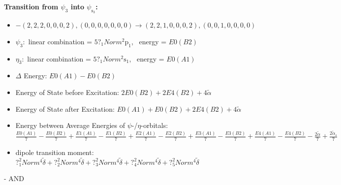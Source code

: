 \documentclass[12pt,a4paper]{article}
\begin{document}
        \noindent\textbf{Transition from $\psi_{3}$ into $\psi_{\text{s}_{3}}$:}
        \begin{itemize}
            \item $- (2, 2, 2, 0, 0, 0, 2), (0, 0, 0, 0, 0, 0, 0) \rightarrow (2, 2, 1, 0, 0, 0, 2), (0, 0, 1, 0, 0, 0, 0)$
        
            \item $\psi_{3}:$ linear combination = $5 ?_{1} Norm^{2} \text{p}_{1}$, \
            energy = $E0(B2)$
            
            \item $\eta_{3}:$ linear combination = $5 ?_{1} Norm^{2} \text{s}_{1}$, \
            energy = $E0(A1)$
            
                \item $\Delta$ Energy: $E0(A1) - E0(B2)$
                \item Energy of State before Excitation: $2 E0(B2) + 2 E4(B2) + 4 \tilde{\alpha}$
                \item Energy of State after Excitation: $E0(A1) + E0(B2) + 2 E4(B2) + 4 \tilde{\alpha}$
                \item Energy between Average Energies of $\psi$-/$\eta$-orbitals: $\frac{E0(A1)}{7} - \frac{E0(B2)}{7} + \frac{E1(A1)}{7} - \frac{E1(B2)}{7} + \frac{E2(A1)}{7} - \frac{E2(B2)}{7} + \frac{E3(A1)}{7} - \frac{E3(B2)}{7} + \frac{E4(A1)}{7} - \frac{E4(B2)}{7} - \frac{2 \tilde{\alpha}}{7} + \frac{2 \tilde{\alpha}_{s}}{7}$
            
            \item dipole transition moment: $?_{1}^{2} Norm^{4} \tilde{\delta} + ?_{2}^{2} Norm^{4} \tilde{\delta} + ?_{3}^{2} Norm^{4} \tilde{\delta} + ?_{4}^{2} Norm^{4} \tilde{\delta} + ?_{5}^{2} Norm^{4} \tilde{\delta}$
        
        \end{itemize}
        
 -  AND 
\end{document}

